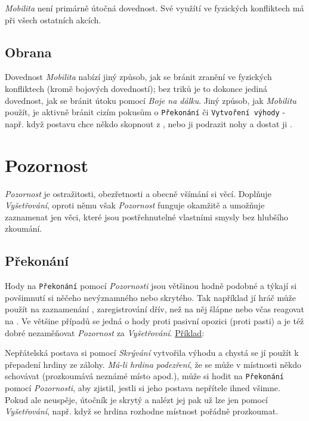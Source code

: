 \documentclass[../main.tex]{subfiles}
\begin{document}
\textit{Mobilita} není primárně útočná dovednost. Své využítí ve fyzických konfliktech má při všech ostatních akcích.

\subsection*{Obrana}
\label{subsec:mobilita-obrana}
\obrana

Dovednost \textit{Mobilita} nabízí jiný způsob, jak se bránit zranění ve fyzických konfliktech (kromě bojových dovedností); bez triků je to dokonce jediná dovednost, jak se bránit útoku pomocí \textit{Boje na dálku}. Jiný způsob, jak \textit{Mobilitu} použít, je aktivně bránit cizím pokusům o \texttt{Překonání} či \texttt{Vytvoření výhody} - např. když postavu chce někdo skopnout z , nebo ji podrazit nohy a dostat ji . 

\section{Pozornost}
\label{sec:pozornost}

\textit{Pozornost} je ostražitosti, obezřetnosti a obecně všímání si věcí. Doplňuje \textit{Vyšetřování}, oproti němu však \textit{Pozornost} funguje okamžitě a umožňuje zaznamenat jen věci, které jsou postřehnutelné vlastními smysly bez hlubšího zkoumání. 

\subsection*{Překonání}
\label{subsec:pozornost-prekonani}
\prekonani

Hody na \texttt{Překonání} pomocí \textit{Pozornosti} jsou většinou hodně podobné a týkají si povšimnutí si něčeho nevýznamného nebo skrytého. Tak například jí hráč může použít na zaznamenání , zaregistrování  dřív, než na něj šlápne nebo včas reagovat na . Ve většine případů se jedná o hody proti pasivní opozici (proti pasti) a je též dobré nezaměňovat \textit{Pozornost} za \textit{Vyšetřování}. \underline{Příklad}:

Nepřátelská postava si pomocí \textit{Skrývání} vytvořila výhodu  a chystá se jí použít k přepadení hrdiny ze zálohy. \textit{Má-li hrdina podezření}, že se může v místnosti někdo schovávat (prozkoumává neznámé místo apod.), může si hodit na \texttt{Překonání} pomocí \textit{Pozornosti}, aby zjistil, jestli si jeho postava nepřítele ihned všimne. Pokud ale neuspěje, útočník je skrytý a nalézt jej pak už lze jen pomocí \textit{Vyšetřování}, např. když se hrdina rozhodne místnost pořádně prozkoumat.
\end{document}

